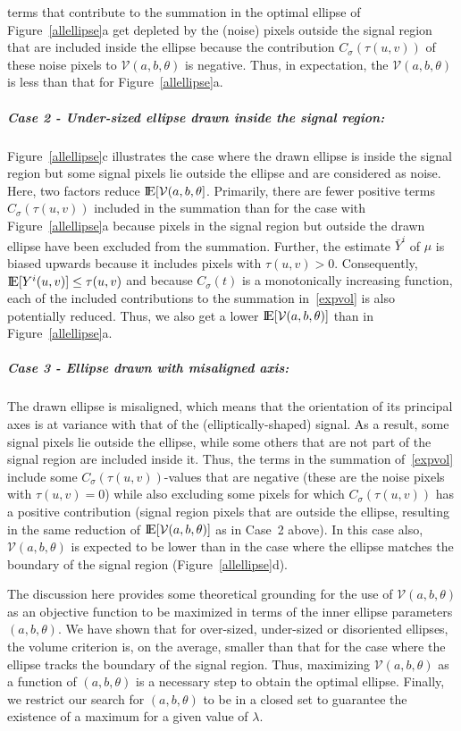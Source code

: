 \documentclass[12pt]{article}
\newcommand{\mV}{\mathcal V}
\newcommand{\E}{\mbox{I\!E}}
\begin{document}
terms that contribute to the summation in the optimal ellipse of
Figure~\ref{allellipse}a get depleted by the (noise) pixels outside the signal
region that are included inside the ellipse because the contribution
$C_\sigma(\tau(u,v))$ of  these noise pixels to $\mV(a,b,\theta)$ is
negative. Thus, in expectation,  
the $\mV(a,b,\theta)$ is less than that for Figure~\ref{allellipse}a. 
\subparagraph{Case 2 - Under-sized ellipse drawn inside the signal
  region:} Figure~\ref{allellipse}c illustrates the case where 
the drawn ellipse is inside the signal region but some signal
pixels lie outside the ellipse and are considered as noise. Here, two
factors reduce $\E[\mV(a,b,\theta]$. Primarily, there 
are fewer positive terms $C_\sigma(\tau(u,v))$ 
included in the summation than for the case with
Figure~\ref{allellipse}a because pixels in the 
signal region but outside the drawn ellipse have been excluded from
the summation. Further, the estimate $\bar Y^i$ of $\mu$ is biased
upwards because it includes pixels with $\tau(u,v) >
0$. Consequently, $\E[Y^i(u,v)] \leq \tau(u,v)$ and because 
$C_\sigma(t)$ is a monotonically increasing function, 
each of the included contributions to the summation in~\eqref{expvol} is
also potentially reduced. %
Thus, we also get a lower $\E[\mV(a,b,\theta)]$ than in
Figure~\ref{allellipse}a. 
\subparagraph{Case 3 - Ellipse drawn with misaligned axis:} The drawn
ellipse is misaligned, which means that the orientation of its principal
axes is at variance with that of the (elliptically-shaped) signal. As
a result, some signal pixels lie outside the ellipse, while some
others  that are not part of the signal region are included inside
it. Thus, the terms in the summation of~\eqref{expvol} include some 
$C_\sigma(\tau(u,v))$-values that are negative (these are the noise pixels
with $\tau(u,v) = 0$) while also excluding some pixels for which
$C_\sigma(\tau(u,v))$ has a positive contribution (signal region
pixels that are outside the ellipse, resulting in the same reduction of
$\E[\mV(a,b,\theta)]$ as in Case~2 above). In this case also,
$\mV(a,b,\theta)$ is expected to be lower  than in the case where the
ellipse matches the boundary of the signal region
(Figure~\ref{allellipse}d).    

The discussion here provides some theoretical grounding for the use of
$\mV(a, b, \theta)$ as an objective function to be maximized in terms
of the inner ellipse parameters $(a,b,\theta)$. We have shown that for
over-sized, under-sized or disoriented
ellipses, the volume criterion is,  on the average, smaller than that
for the case where the ellipse tracks the boundary of the signal
region. Thus, maximizing $\mV(a, b, \theta)$ as a function of  
$(a,b,\theta)$ is a necessary step to  obtain the optimal
ellipse. Finally, we restrict our search for $(a,b,\theta)$ to be
in a closed set to guarantee the existence of a maximum for a given value of
$\lambda$.
\end{document}
